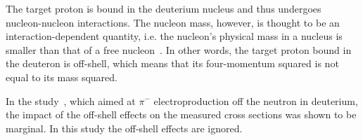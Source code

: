 The target proton is bound in the deuterium nucleus and thus undergoes nucleon-nucleon interactions. The nucleon mass, however, is thought to be an interaction-dependent quantity, i.e. the nucleon's physical mass in a nucleus is smaller than that of a free nucleon~\cite{Noble:1980my}. In other words, the target proton bound in the deuteron is off-shell, which means that its four-momentum squared is not equal to its mass squared.

In the study~\cite{Ye_Tian:2017}, which aimed at $\pi^{-}$ electroproduction off the neutron in deuterium, the impact of the off-shell effects on the measured cross sections was shown to be marginal. In this study the off-shell effects are ignored.



